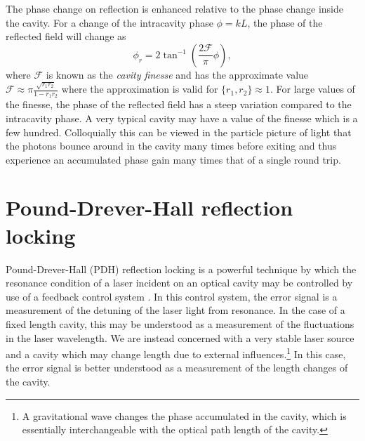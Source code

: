 The phase change on reflection is enhanced relative to the phase change inside the cavity. %
For a change of the intracavity phase $\phi = k L$, the phase of the reflected field will change as
\begin{equation}
\phi_r=2\tan^{-1}\left(\frac{2\mathcal{F}}{\pi}\phi\right),
\end{equation}
where $\mathcal{F}$ is known as the \emph{cavity finesse} and has the approximate value $\mathcal{F}\approx \pi\frac{\sqrt{r_1r_2}}{1-r_1r_2}$ where the approximation is valid for $\{r_1,r_2\}\approx 1$. %
For large values of the finesse, the phase of the reflected field has a steep variation compared to the intracavity phase. %
A very typical cavity may have a value of the finesse which is a few hundred. %
Colloquially this can be viewed in the particle picture of light that the photons bounce around in the cavity many times before exiting and thus experience an accumulated phase gain many times that of a single round trip.

\section{Pound-Drever-Hall reflection locking}
Pound-Drever-Hall (PDH) reflection locking is a powerful technique by which the resonance condition of a laser incident on an optical cavity may be controlled by use of a feedback control system \cite{PDH}. %
In this control system, the error signal is a measurement of the detuning of the laser light from resonance. %
In the case of a fixed length cavity, this may be understood as a measurement of the fluctuations in the laser wavelength. %
We are instead concerned with a very stable laser source and a cavity which may change length due to external influences.\footnote{A gravitational wave changes the phase accumulated in the cavity, which is essentially interchangeable with the optical path length of the cavity.} In this case, the error signal is better understood as a measurement of the length changes of the cavity.

